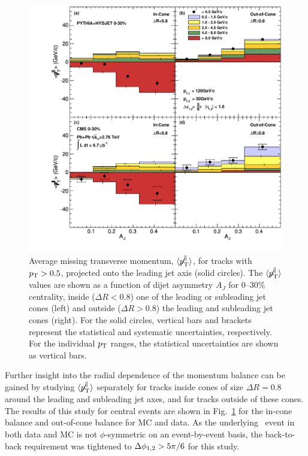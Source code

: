 \begin{figure}[!h]
\begin{center}
\includegraphics[width=0.98\mboxwidth]{jetfigures/missingPtParallel-Corrected-data-InConeOutConeDPhiCut_ntv6_2.pdf}
\caption{Average missing transverse momentum,
$\langle \displaystyle{\not} p_{\mathrm{T}}^{\parallel} \rangle$,
for tracks with $p_{\rm{T}} > 0.5$\GeVc, projected onto the leading jet axis (solid circles).
The $\langle \displaystyle{\not} p_{\mathrm{T}}^{\parallel} \rangle$ values are shown as a function of dijet asymmetry
$A_J$ for 0--30\% centrality, inside ($\Delta R < 0.8$) one of the leading or subleading jet cones (left) and
outside ($\Delta R > 0.8$) the leading and subleading jet cones (right).
For the solid circles, vertical bars and brackets represent
the statistical and systematic uncertainties, respectively.
For the individual $p_{\rm{T}}$ ranges, the statistical uncertainties are shown as vertical bars. }
\label{fig:GR:MissingpT}
\end{center}
\end{figure}

Further insight into the radial dependence of the momentum balance can be gained by studying
$\langle \displaystyle{\not} p_{\mathrm{T}}^{\parallel} \rangle$ separately for tracks inside cones of size $\Delta R = 0.8$
around the leading and subleading jet axes, and for tracks outside of these cones. The results of this study for central events
are shown in Fig.~\ref{fig:GR:MissingpT} for the in-cone balance and out-of-cone balance for MC and data.
As the underlying \PbPb\ event in both data and MC is not $\phi$-symmetric on an event-by-event basis, the back-to-back requirement
was tightened to $\Delta\phi_{1,2} > 5 \pi/6$ for this study.

